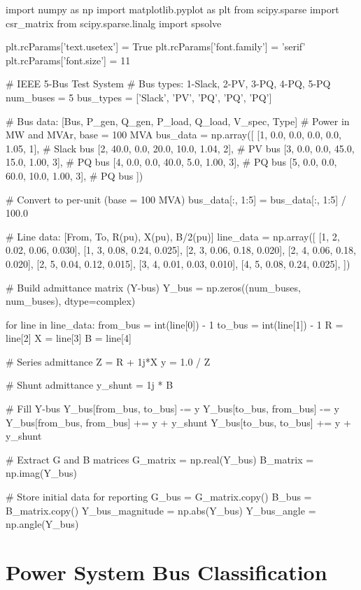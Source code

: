 \documentclass[11pt,a4paper]{article}
\begin{document}
\begin{pycode}
import numpy as np
import matplotlib.pyplot as plt
from scipy.sparse import csr_matrix
from scipy.sparse.linalg import spsolve

plt.rcParams['text.usetex'] = True
plt.rcParams['font.family'] = 'serif'
plt.rcParams['font.size'] = 11

# IEEE 5-Bus Test System
# Bus types: 1-Slack, 2-PV, 3-PQ, 4-PQ, 5-PQ
num_buses = 5
bus_types = ['Slack', 'PV', 'PQ', 'PQ', 'PQ']

# Bus data: [Bus, P_gen, Q_gen, P_load, Q_load, V_spec, Type]
# Power in MW and MVAr, base = 100 MVA
bus_data = np.array([
    [1, 0.0, 0.0, 0.0, 0.0, 1.05, 1],    # Slack bus
    [2, 40.0, 0.0, 20.0, 10.0, 1.04, 2],  # PV bus
    [3, 0.0, 0.0, 45.0, 15.0, 1.00, 3],   # PQ bus
    [4, 0.0, 0.0, 40.0, 5.0, 1.00, 3],    # PQ bus
    [5, 0.0, 0.0, 60.0, 10.0, 1.00, 3],   # PQ bus
])

# Convert to per-unit (base = 100 MVA)
bus_data[:, 1:5] = bus_data[:, 1:5] / 100.0

# Line data: [From, To, R(pu), X(pu), B/2(pu)]
line_data = np.array([
    [1, 2, 0.02, 0.06, 0.030],
    [1, 3, 0.08, 0.24, 0.025],
    [2, 3, 0.06, 0.18, 0.020],
    [2, 4, 0.06, 0.18, 0.020],
    [2, 5, 0.04, 0.12, 0.015],
    [3, 4, 0.01, 0.03, 0.010],
    [4, 5, 0.08, 0.24, 0.025],
])

# Build admittance matrix (Y-bus)
Y_bus = np.zeros((num_buses, num_buses), dtype=complex)

for line in line_data:
    from_bus = int(line[0]) - 1
    to_bus = int(line[1]) - 1
    R = line[2]
    X = line[3]
    B = line[4]

    # Series admittance
    Z = R + 1j*X
    y = 1.0 / Z

    # Shunt admittance
    y_shunt = 1j * B

    # Fill Y-bus
    Y_bus[from_bus, to_bus] -= y
    Y_bus[to_bus, from_bus] -= y
    Y_bus[from_bus, from_bus] += y + y_shunt
    Y_bus[to_bus, to_bus] += y + y_shunt

# Extract G and B matrices
G_matrix = np.real(Y_bus)
B_matrix = np.imag(Y_bus)

# Store initial data for reporting
G_bus = G_matrix.copy()
B_bus = B_matrix.copy()
Y_bus_magnitude = np.abs(Y_bus)
Y_bus_angle = np.angle(Y_bus)
\end{pycode}

\section{Power System Bus Classification}
\end{document}
